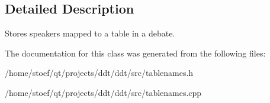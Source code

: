 \subsection{Detailed Description}
Stores speakers mapped to a table in a debate. 

The documentation for this class was generated from the following files\-:\begin{DoxyCompactItemize}
\item 
/home/stoef/qt/projects/ddt/ddt/src/tablenames.\-h\item 
/home/stoef/qt/projects/ddt/ddt/src/tablenames.\-cpp\end{DoxyCompactItemize}
